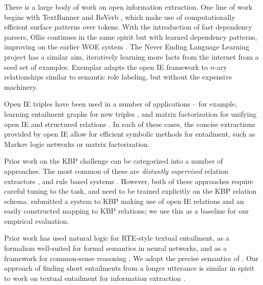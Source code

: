There is a large body of work on open information extraction.
One line of work begins with
  TextRunner \cite{key:2007yates-textrunner} and
  ReVerb \cite{key:2011fader-reverb}, which make use of computationally
  efficient surface patterns over tokens.
With the introduction of fast dependency parsers,
  Ollie \cite{key:2012mausam-ollie} continues in the same spirit but with
  learned dependency patterns, improving on the earlier WOE system
  \cite{key:2010wu-openie}.
The Never Ending Language Learning project \cite{key:2010carlson-nell}
  has a similar aim, iteratively learning more facts from the internet
  from a seed set of examples.
Exemplar \cite{key:2013mesquita-exemplar} adapts the open IE framework to
  $n$-ary relationships similar to semantic role labeling, but without the
  expensive machinery.

Open IE triples have been used in a number of applications --
  for example, learning entailment graphs for new triples
  \cite{key:2011berant-entailment}, and
  matrix factorization for unifying open IE and structured relations
  \cite{key:2012yao-schemas,key:2013riedel-schemas}.
In each of these cases, the concise extractions provided by open IE allow
  for efficient symbolic methods for entailment, such as Markov logic
  networks or matrix factorization.

Prior work on the KBP challenge can be categorized into a number of approaches.
The most common of these are \textit{distantly supervised} relation extractors
  \cite{key:1999craven-distsup,key:2007wu-distsup,key:2009mintz-distsup,key:2011sun-kbp},
  and rule based systems
  \cite{key:1997soderland-kbp,key:2010grishman-kbp,key:2010chen-kbp}.
However, both of these approaches require careful tuning to the task, and
  need to be trained explicitly on the KBP relation schema.
 submitted a system to KBP making use of
  open IE relations and an easily constructed mapping to KBP relations;
  we use this as a baseline for our empirical evaluation.

Prior work has used natural logic
  for RTE-style textual entailment,
  as a formalism well-suited for formal semantics in neural networks,
  and as a framework for common-sense reasoning
  \cite{key:2009maccartney-natlog,key:2012watanabe-natlog,key:2014bowman-natlog,key:2014angeli-naturalli}.
We adopt the precise semantics of .
Our approach of finding short entailments from a longer utterance is similar
  in spirit to work on textual entailment for information extraction
  \cite{key:2006romano-ie}.

